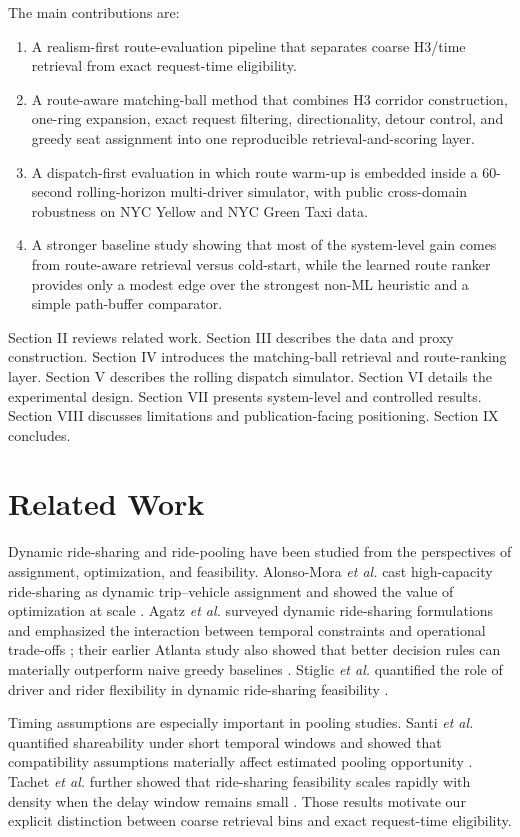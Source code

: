 \documentclass[journal]{IEEEtran}
\begin{document}
The main contributions are:
\begin{enumerate}
    \item A realism-first route-evaluation pipeline that separates coarse H3/time retrieval from exact request-time eligibility.
    \item A route-aware matching-ball method that combines H3 corridor construction, one-ring expansion, exact request filtering, directionality, detour control, and greedy seat assignment into one reproducible retrieval-and-scoring layer.
    \item A dispatch-first evaluation in which route warm-up is embedded inside a 60-second rolling-horizon multi-driver simulator, with public cross-domain robustness on NYC Yellow and NYC Green Taxi data.
    \item A stronger baseline study showing that most of the system-level gain comes from route-aware retrieval versus cold-start, while the learned route ranker provides only a modest edge over the strongest non-ML heuristic and a simple path-buffer comparator.
\end{enumerate}

Section II reviews related work. Section III describes the data and proxy construction. Section IV introduces the matching-ball retrieval and route-ranking layer. Section V describes the rolling dispatch simulator. Section VI details the experimental design. Section VII presents system-level and controlled results. Section VIII discusses limitations and publication-facing positioning. Section IX concludes.

\section{Related Work}
Dynamic ride-sharing and ride-pooling have been studied from the perspectives of assignment, optimization, and feasibility. Alonso-Mora \emph{et al.} cast high-capacity ride-sharing as dynamic trip--vehicle assignment and showed the value of optimization at scale \cite{alonso2017}. Agatz \emph{et al.} surveyed dynamic ride-sharing formulations and emphasized the interaction between temporal constraints and operational trade-offs \cite{agatz2012}; their earlier Atlanta study also showed that better decision rules can materially outperform naive greedy baselines \cite{agatz2011}. Stiglic \emph{et al.} quantified the role of driver and rider flexibility in dynamic ride-sharing feasibility \cite{stiglic2016}.

Timing assumptions are especially important in pooling studies. Santi \emph{et al.} quantified shareability under short temporal windows and showed that compatibility assumptions materially affect estimated pooling opportunity \cite{santi2014}. Tachet \emph{et al.} further showed that ride-sharing feasibility scales rapidly with density when the delay window remains small \cite{tachet2017}. Those results motivate our explicit distinction between coarse retrieval bins and exact request-time eligibility.
\end{document}

